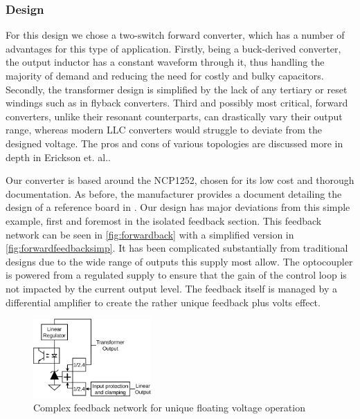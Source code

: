 \documentclass[15pt]{article}
\begin{document}
\subsubsection{Design} 
For this design we chose a two-switch forward converter, which has a number of advantages for this type of application. Firstly, being a buck-derived converter, the output inductor has a constant waveform through it, thus handling the majority of demand and reducing the need for costly and bulky capacitors. Secondly, the transformer design is simplified by the lack of any tertiary or reset windings such as in flyback converters. Third and possibly most critical, forward converters, unlike their resonant counterparts, can drastically vary their output range, whereas modern LLC converters would struggle to deviate from the designed voltage.  The pros and cons of various topologies are discussed more in depth in Erickson et. al.\cite{2}.

Our converter is based around the NCP1252, chosen for its low cost and thorough documentation. As before, the manufacturer provides a document detailing the design of a reference board in \cite{9}. Our design has major deviations from this simple example, first and foremost in the isolated feedback section. This feedback network can be seen in \autoref{fig:forwardback} with a simplified version in \autoref{fig:forwardfeedbacksimp}. It has been complicated substantially from traditional designs due to the wide range of outputs this supply most allow. The optocoupler is powered from a regulated supply to ensure that the gain of the control loop is not impacted by the current output level. The feedback itself is managed by a differential amplifier to create the rather unique feedback plus volts effect.

\begin{figure}[H]
    \begin{center}
    \includegraphics[width=0.4\textwidth]{forwardfeedbacksimp}
    \end{center}
    \caption{Complex feedback network for unique floating voltage operation}
    \label{fig:forwardfeedbacksimp}
\end{figure}
\end{document}
